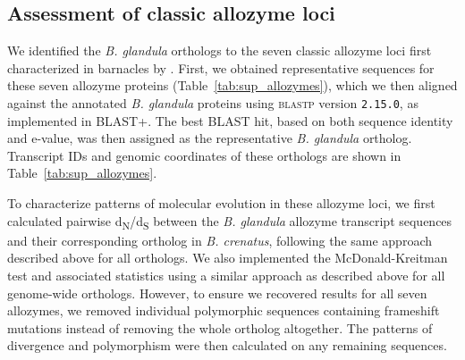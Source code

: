 \documentclass[11pt]{article}
\newcommand{\dnds}{d\textsubscript{N}/d\textsubscript{S}\xspace}
\newcommand{\bgla}{\textit{B. glandula}\xspace}
\begin{document}
\subsection*{Assessment of classic allozyme loci}

We identified the \bgla{} orthologs to the seven classic allozyme loci first
characterized in barnacles by \cite{flowerdew_electrophoretic_1983}.
First, we obtained representative sequences for these seven allozyme proteins
(Table~\ref{tab:sup_allozymes}), which we then aligned against the annotated
\bgla{} proteins using \textsc{blastp} version \texttt{2.15.0}, as implemented
in \textsc{BLAST+}.
The best \textsc{BLAST} hit, based on both sequence identity and e-value, was
then assigned as the representative \bgla{} ortholog.
Transcript IDs and genomic coordinates of these orthologs are shown in
Table~\ref{tab:sup_allozymes}.
\vspace{0.2cm}

To characterize patterns of molecular evolution in these allozyme loci, we first
calculated pairwise \dnds{} between the \bgla{} allozyme transcript sequences and
their corresponding ortholog in \textit{B. crenatus}, following the same approach
described above for all orthologs.
We also implemented the McDonald-Kreitman test and associated statistics using a
similar approach as described above for all genome-wide orthologs.
However, to ensure we recovered results for all seven allozymes, we removed
individual polymorphic sequences containing frameshift mutations instead of removing
the whole ortholog altogether.
The patterns of divergence and polymorphism were then calculated on any remaining
sequences.
\vspace{0.2cm}
\end{document}
